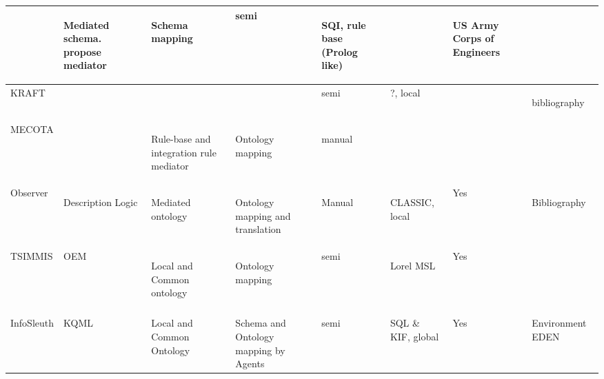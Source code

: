 \begin{longtable}{|p{}|p{}|p{}|p{}|p{}|p{}|p{}|p{}|}
&
\begin{spacing}{0.7}
{\tiny Mediated schema. propose mediator}\end{spacing}
&
\begin{spacing}{0.7}
{\tiny Schema mapping}\end{spacing}
&
{\tiny semi}&
\begin{spacing}{0.7}
{\tiny SQI, rule base (Prolog like)}\end{spacing}
&
&
\begin{spacing}{0.7}
{\tiny US Army Corps of Engineers}\end{spacing}
\tabularnewline
\hline 
{\tiny KRAFT}&
&
&
&
{\tiny semi}&
{\tiny ?, local}&
&
\begin{spacing}{0.7}
{\tiny bibliography}\end{spacing}
\tabularnewline
\hline 
{\tiny MECOTA}&
&
\begin{spacing}{0.7}
{\tiny Rule-base and integration rule mediator}\end{spacing}
&
\begin{spacing}{0.7}
{\tiny Ontology mapping}\end{spacing}
&
\begin{spacing}{0.7}
{\tiny manual}\end{spacing}
&
&
&
\tabularnewline
\hline 
{\tiny Observer}&
\begin{spacing}{0.7}
{\tiny Description Logic}\end{spacing}
&
\begin{spacing}{0.7}
{\tiny Mediated ontology}\end{spacing}
&
\begin{spacing}{0.7}
{\tiny Ontology mapping and translation}\end{spacing}
&
\begin{spacing}{0.7}
{\tiny Manual}\end{spacing}
&
\begin{spacing}{0.7}
{\tiny CLASSIC, local}\end{spacing}
&
{\tiny Yes}&
\begin{spacing}{0.7}
{\tiny Bibliography}\end{spacing}
\tabularnewline
\hline 
{\tiny TSIMMIS}&
{\tiny OEM}&
\begin{spacing}{0.7}
{\tiny Local and Common ontology}\end{spacing}
&
\begin{spacing}{0.7}
{\tiny Ontology mapping}\end{spacing}
&
{\tiny semi}&
\begin{spacing}{0.7}
{\tiny Lorel MSL}\end{spacing}
&
{\tiny Yes}&
\tabularnewline
\hline 
&
&
&
&
&
&
&
\tabularnewline
\hline 
{\tiny InfoSleuth}&
{\tiny KQML}&
{\tiny Local and Common Ontology}&
{\tiny Schema and Ontology mapping by Agents}&
{\tiny semi}&
{\tiny SQL \& KIF, global}&
{\tiny Yes}&
{\tiny Environment EDEN}\tabularnewline
\hline
\end{longtable}

